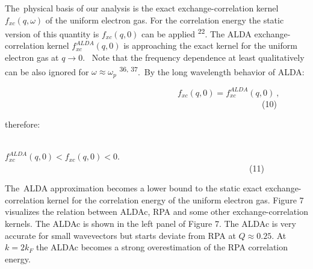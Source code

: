 \documentclass[12pt]{article}
\renewcommand{\_}{\kern-1.5pt\textunderscore\kern-1.5pt}
\begin{document}
\begin{justify}
The\ physical basis of our analysis is the exact exchange-correlation kernel   \( f_{xc} \left( q, \omega  \right)  \)  of the uniform electron gas. For the correlation energy the static version of this quantity is  \( f_{xc} \left( q,0 \right)  \)  can be applied \textsuperscript{22}. The ALDA exchange-correlation kernel  \( f_{xc}^{ALDA} \left( q,0 \right)  \)  is approaching the exact kernel for the uniform electron gas at  \( q \rightarrow 0. \) \  Note that the frequency dependence at least qualitatively can be also ignored for  \(  \omega  \approx  \omega _{p} \)  \textsuperscript{36, 37}.\  By the long wavelength behavior of ALDA:
\end{justify}\par


\vspace{\baselineskip}
\setlength{\parskip}{9.96pt}
\setlength{\parskip}{0.0pt}
\begin{Center}
\ \ \ \ \ \ \ \ \ \ \ \ \ \ \ \ \ \ \ \ \ \ \ \ \ \ \ \ \ \ \ \ \ \ \ \ \ \ \ \ \   \( f_{xc} \left( q,0 \right) =f_{xc}^{ALDA} \left( q,0 \right) ~, \) \ \ \ \ \ \ \ \ \ \ \ \ \ \ \ \ \ \ \ \ \ \ \ \ \ \ \ \ \ \ \ \ \ \ \ \ \ \ \ \ \ \ \ \ \ \ \ \ \ \ \ \ \ \ \ \ \ \ \ \ \  (10)
\end{Center}\par


\vspace{\baselineskip}
\setlength{\parskip}{9.96pt}
\setlength{\parskip}{0.0pt}
therefore:\par


\vspace{\baselineskip}
\setlength{\parskip}{9.96pt}
\setlength{\parskip}{0.0pt}
\begin{Center}
\ \ \ \ \ \ \ \ \ \ \ \ \ \ \ \ \ \ \ \ \ \ \ \ \ \ \ \ \ \ \ \ \ \ \ \ \ \ \ \ \ \ \ \ \ \ \   \( f_{xc}^{ALDA} \left( q,0 \right) <f_{xc} \left( q,0 \right) <0. \) \ \ \ \ \ \ \ \ \ \ \ \ \ \ \ \ \ \ \ \ \ \ \ \ \ \ \ \ \ \ \ \ \ \ \ \ \ \ \ \ \ \ \ \ \ \ \ \ \ \ \ \ \ \ \ \ \ \  (11)
\end{Center}\par


\vspace{\baselineskip}
\setlength{\parskip}{9.96pt}
\setlength{\parskip}{0.0pt}
\begin{justify}
The\ ALDA approximation becomes a lower bound to the static exact exchange-correlation kernel for the correlation energy of the uniform electron gas. Figure 7 visualizes the relation between ALDAc, RPA and some other exchange-correlation kernels.  The ALDAc is shown in the left panel of Figure 7. The ALDAc is very accurate for small wavevectors but starts deviate from RPA at  \( Q \approx 0.25. \)  At \(  k=2k_{F} \)  the ALDAc becomes a strong overestimation of the RPA correlation energy.
\end{justify}\par
\end{document}

